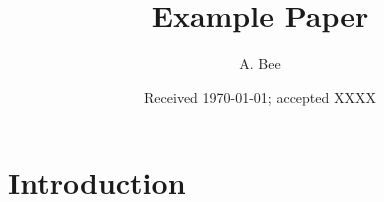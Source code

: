 \documentclass{aa}
\begin{document}
\title{Example Paper}
\author{A. Bee }

\date{Received \today; accepted XXXX}

\abstract{}{}{}{}{}
\keywords{}
 \maketitle

\section{Introduction}

\citet{Stammler2019}
\citet{Birnstiel2010}
\citet{2010A&A...513A..79B}

\begin{acknowledgements}
\end{acknowledgements}



\end{document}
